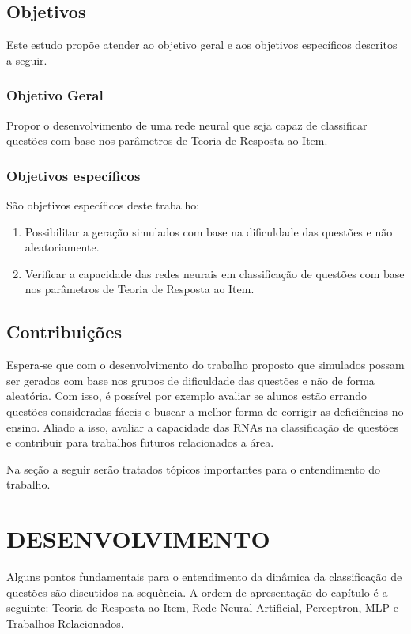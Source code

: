 \documentclass[article,	12pt,	oneside, a4paper,	english, brazil, sumario=tradicional, section=TITLE]{abntex2}
\begin{document}
 
\subsection{Objetivos}
Este estudo propõe atender ao objetivo geral e aos objetivos específicos descritos a seguir.

\subsubsection{Objetivo Geral}
Propor o desenvolvimento de uma rede neural que seja capaz de classificar questões com base nos parâmetros de Teoria de Resposta ao Item.

\subsubsection{Objetivos específicos}
São objetivos específicos deste trabalho:
\begin{enumerate}

\item Possibilitar a geração simulados com base na dificuldade das questões e não aleatoriamente.

\item Verificar a capacidade das redes neurais em classificação de questões com base nos parâmetros de Teoria de Resposta ao Item.
\end{enumerate}

\subsection{Contribuições}
Espera-se que com o desenvolvimento do trabalho proposto que simulados possam ser gerados com base nos grupos de dificuldade das questões e não de forma aleatória. Com isso, é possível por exemplo avaliar se alunos estão errando questões consideradas fáceis e buscar a melhor forma de corrigir as deficiências no ensino. Aliado a isso, avaliar a capacidade das RNAs na classificação de questões e contribuir para trabalhos futuros relacionados a área.

Na seção a seguir serão tratados tópicos importantes para o entendimento do trabalho.
\section{DESENVOLVIMENTO}
Alguns pontos fundamentais para o entendimento da dinâmica da classificação de questões são discutidos na sequência. A ordem de apresentação do capítulo é a seguinte: Teoria de Resposta ao Item, Rede Neural Artificial, Perceptron, MLP e Trabalhos Relacionados.
\end{document}
